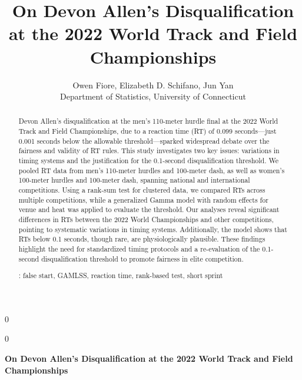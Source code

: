 \documentclass[12pt, letterpaper]{article}
\newcommand{\blind}{0}
\begin{document}

\blind
{
  \title{\bf On Devon Allen's Disqualification at the 2022 World Track and Field
Championships}
  \author{Owen Fiore, %
  Elizabeth D. Schifano, %
  Jun Yan\\[1ex]
  Department of Statistics, University of Connecticut\\
}
\date{}
  \maketitle
} \fi

\blind
{
  \bigskip
  \bigskip
  \bigskip
  \begin{center}
  {\LARGE\bf On Devon Allen's Disqualification at the 2022 World Track and Field
Championships}
\end{center}
  \bigskip
} \fi


\doublespace


\begin{abstract}
Devon Allen’s disqualification at the men's 110-meter hurdle final at
the 2022 World Track and Field Championships, 
due to a reaction time (RT) of 0.099 seconds---just 0.001 seconds below
the allowable threshold---sparked widespread debate over 
the fairness and validity of RT rules. This study investigates two key
issues: variations in timing systems and the justification for the
0.1-second disqualification threshold. We
pooled RT data from men’s 110-meter hurdles and 100-meter dash, as
well as women’s 100-meter hurdles and 100-meter dash, spanning
national and international competitions. Using a rank-sum test for
clustered data, we compared RTs across multiple competitions,
while a generalized Gamma model with random effects for venue and heat
was applied to evaluate the threshold. Our analyses reveal significant
differences in RTs between the 2022 World Championships and other
competitions, pointing to systematic variations in timing
systems. Additionally, the model shows that RTs below 0.1 seconds,
though rare, are physiologically plausible. These findings highlight
the need for standardized timing protocols and a re-evaluation of the
0.1-second disqualification threshold to promote fairness in
elite competition.


\bigskip{}:
false start, GAMLSS, reaction time, rank-based test, short sprint
\end{abstract}
\end{document}
